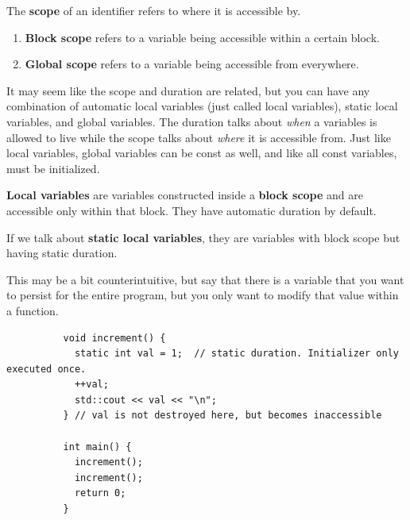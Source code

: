 \documentclass{article}
\newcounter{definition}[section]
\begin{document}
      \begin{definition}[Scope]
        \label{def:scope}
        The \textbf{scope} of an identifier refers to where it is accessible by. 
        \begin{enumerate}
          \item \textbf{Block scope} refers to a variable being accessible within a certain block. 
          \item \textbf{Global scope} refers to a variable being accessible from everywhere.  
        \end{enumerate}
      \end{definition} 

      It may seem like the scope and duration are related, but you can have any combination of automatic local variables (just called local variables), static local variables, and global variables. The duration talks about \textit{when} a variables is allowed to live while the scope talks about \textit{where} it is accessible from. Just like local variables, global variables can be const as well, and like all const variables, must be initialized. 

      \begin{definition}
        \label{def:local-variables}
        \textbf{Local variables} are variables constructed inside a \textbf{block scope} and are accessible only within that block. They have automatic duration by default. 
      \end{definition}

      \begin{definition}
        \label{def:static-local-variables}
        If we talk about \textbf{static local variables}, they are variables with block scope but having static duration. 

        This may be a bit counterintuitive, but say that there is a variable that you want to persist for the entire program, but you only want to modify that value within a function. 
        \begin{lstlisting}
          void increment() {
            static int val = 1;  // static duration. Initializer only executed once. 
            ++val; 
            std::cout << val << "\n";
          } // val is not destroyed here, but becomes inaccessible 

          int main() {
            increment(); 
            increment(); 
            return 0; 
          }
        \end{lstlisting}
      \end{definition}
\end{document}
